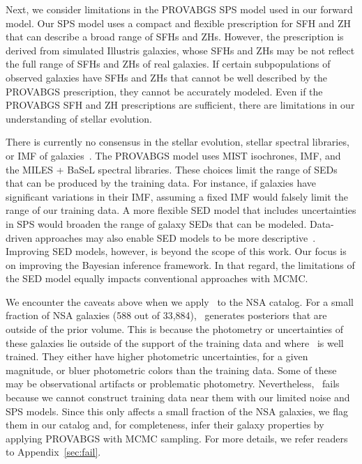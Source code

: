Next, we consider limitations in the PROVABGS SPS model used in our forward
model. 
Our SPS model uses a compact and flexible prescription for SFH and ZH that can
describe a broad range of SFHs and ZHs.
However, the prescription is derived from simulated Illustris galaxies, whose
SFHs and ZHs may be not reflect the full range of SFHs and ZHs of real
galaxies.
If certain subpopulations of observed galaxies have SFHs and ZHs that cannot be
well described by the PROVABGS prescription, they cannot be accurately modeled.
Even if the PROVABGS SFH and ZH prescriptions are sufficient, there are
limitations in our understanding of stellar evolution. 

There is currently no consensus in the stellar evolution, stellar spectral
libraries, or IMF of galaxies~\citep[\emph{e.g.}][]{treu2010, vandokkum2010,
rosani2018, ge2019, sonnenfeld2019}.
The PROVABGS model uses MIST isochrones, \cite{chabrier2003} IMF, and the MILES
+ BaSeL spectral libraries. 
These choices limit the range of SEDs that can be produced by the training
data. 
For instance, if galaxies have significant variations in their IMF, assuming a
fixed IMF would falsely limit the range of our training data.  
A more flexible SED model that includes uncertainties in SPS would broaden the
range of galaxy SEDs that can be modeled.
Data-driven approaches may also enable SED models to be more
descriptive~\citep[\emph{e.g.}][]{hogg2016, portillo2020}. 
Improving  SED models, however, is beyond the scope of this work. 
Our focus is on improving the Bayesian inference framework.
In that regard, the limitations of the SED model equally impacts conventional
approaches with MCMC. 

We encounter the caveats above when we apply \sedflow~to the NSA catalog. 
For a small fraction of NSA galaxies (588 out of 33,884), \sedflow~generates
posteriors that are outside of the prior volume. 
This is because the photometry or uncertainties of these galaxies lie outside
of the support of the training data and where \sedflow~is well trained. 
They either have higher photometric uncertainties, for a given magnitude, or
bluer photometric colors than the training data. 
Some of these may be observational artifacts or problematic photometry.
Nevertheless, \sedflow~fails because we cannot construct training data near
them with our limited noise and SPS models. 
Since this only affects a small fraction of the NSA galaxies, we flag them in
our catalog and, for completeness, infer their galaxy properties by applying
PROVABGS with MCMC sampling.
For more details, we refer readers to Appendix~\ref{sec:fail}.

